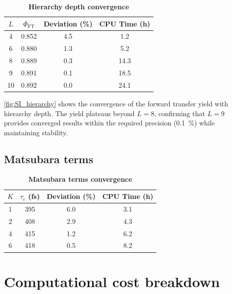 \documentclass[11pt,a4paper]{article}
\begin{document}
\begin{table}[h]
\centering
\caption{\textbf{Hierarchy depth convergence}}
\label{tab:SI_hierarchy}
\begin{tabular}{cccc}
\toprule
\textbf{$L$} & \textbf{$\Phi_{\mathrm{FT}}$} & \textbf{Deviation (\si{\percent})} & \textbf{CPU Time (\si{\hour})} \\
\midrule
4 & 0.852 & 4.5 & 1.2 \\
6 & 0.880 & 1.3 & 5.2 \\
8 & 0.889 & 0.3 & 14.3 \\
9 & 0.891 & 0.1 & 18.5 \\
10 & 0.892 & 0.0 & 24.1 \\
\bottomrule
\end{tabular}
\end{table}

\cref{fig:SI_hierarchy} shows the convergence of the forward transfer yield with hierarchy depth. The yield plateaus beyond $L=8$, confirming that $L=9$ provides converged results within the required precision (\SI{0.1}{\percent}) while maintaining stability.

\subsection{Matsubara terms}

\begin{table}[h]
\centering
\caption{\textbf{Matsubara terms convergence}}
\label{tab:SI_matsubara}
\begin{tabular}{cccc}
\toprule
\textbf{$K$} & \textbf{$\tau_c$ (\si{\femto\second})} & \textbf{Deviation (\si{\percent})} & \textbf{CPU Time (\si{\hour})} \\
\midrule
1 & 395 & 6.0 & 3.1 \\
2 & 408 & 2.9 & 4.3 \\
4 & 415 & 1.2 & 6.2 \\
6 & 418 & 0.5 & 8.2 \\
\bottomrule
\end{tabular}
\end{table}


\section{Computational cost breakdown}
\end{document}
